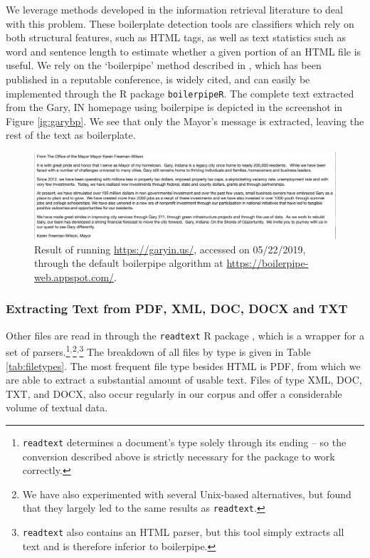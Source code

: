 \documentclass[11pt]{article}
\begin{document}
We leverage methods developed in the information retrieval literature to deal with this problem. These boilerplate detection tools are classifiers which rely on both structural features, such as HTML tags, as well as text statistics such as word and sentence length to estimate whether a given portion of an HTML file is useful. We rely on the `boilerpipe' method described in \cite{Kohlschutter2010}, which has been published in a reputable conference, is widely cited, and can easily be implemented through the R package \texttt{boilerpipeR}. The complete text extracted from the Gary, IN homepage using boilerpipe is depicted in the screenshot in Figure \ref{ig:garybp}. We see that only the Mayor's message is extracted, leaving the rest of the text as boilerplate.


\begin{figure}
\centering
\includegraphics[scale=0.375]{figures/gary_bp}
\caption{Result of running \url{https://garyin.us/}, accessed on 05/22/2019, through the default boilerpipe algorithm at \url{https://boilerpipe-web.appspot.com/}.}
\label{fig:gary_bp}
\end{figure}

\subsubsection{Extracting Text from PDF, XML, DOC, DOCX and TXT}
Other files are read in through the \texttt{readtext} R package \citep{readtext}, which is a wrapper for a set of parsers.\footnote{\texttt{readtext} determines a document's type solely through its ending -- so the conversion described above is strictly necessary for the package to work correctly.}$^{,}$\footnote{We have also experimented with several Unix-based alternatives, but found that they largely led to the same results as \texttt{readtext}.}$^{,}$\footnote{\texttt{readtext} also contains an HTML parser, but this tool simply extracts all text and is therefore inferior to boilerpipe.} The breakdown of all files by type is given in Table \ref{tab:filetypes}. The most frequent file type besides HTML is PDF, from which we are able to extract a substantial amount of usable text. Files of type XML, DOC, TXT, and DOCX, also occur regularly in our corpus and offer a considerable volume of textual data.
\end{document}

